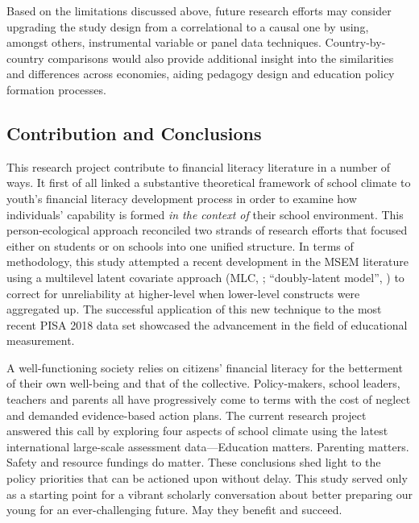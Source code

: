 Based on the limitations discussed above, future research efforts may consider upgrading the study design from a correlational to a causal one by using, amongst others, instrumental variable \parencite{pokropek:2016} or panel data \parencite{salasvelasco:2019} techniques. Country-by-country comparisons would also provide additional insight into the similarities and differences across economies, aiding pedagogy design and education policy formation processes.

\subsection{Contribution and Conclusions}

This research project contribute to financial literacy literature in a number of ways. It first of all linked a substantive theoretical framework of school climate to youth's financial literacy development process in order to examine how individuals' capability is formed \emph{in the context of} their school environment. This person-ecological approach reconciled two strands of research efforts that focused either on students or on schools into one unified structure. In terms of methodology, this study attempted a recent development in the MSEM literature using a multilevel latent covariate approach (MLC, \textcite{ludtke:2008}; ``doubly-latent model'', \textcite{marsh:2009}) to correct for unreliability at higher-level when lower-level constructs were aggregated up. The successful application of this new technique to the most recent PISA 2018 data set showcased the advancement in the field of educational measurement.


A well-functioning society relies on citizens' financial literacy for the betterment of their own well-being and that of the collective. Policy-makers, school leaders, teachers and parents all have progressively come to terms with the cost of neglect and demanded evidence-based action plans. The current research project answered this call by exploring four aspects of school climate using the latest international large-scale assessment data---Education matters. Parenting matters. Safety and resource fundings do matter. These conclusions shed light to the policy priorities that can be actioned upon without delay. This study served only as a starting point for a vibrant scholarly conversation about better preparing our young for an ever-challenging future. May they benefit and succeed.